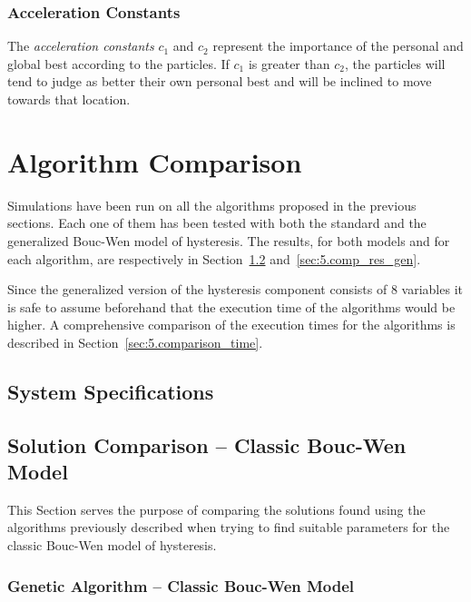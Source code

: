 \subsubsection{Acceleration Constants}
\label{sec:5.pso.constants}

The \textit{acceleration constants} $c_1$ and $c_2$ represent
the importance of the personal and global best according to the particles.
If $c_1$ is greater than $c_2$, the particles will tend to judge as better
their own personal best and will be inclined to move towards that location.


\section{Algorithm Comparison}
\label{sec:5.res}

Simulations have been run on all the algorithms proposed in the previous sections.
Each one of them has been tested with both the standard and the generalized Bouc-Wen
model of hysteresis. The results, for both models and for each algorithm,
are respectively in Section~\ref{sec:5.comp_res_classic} and~\ref{sec:5.comp_res_gen}.

Since the generalized version of the hysteresis component consists of 8 variables
it is safe to assume beforehand that the execution time of the algorithms would be higher.
A comprehensive comparison of the execution times for the algorithms is described in
Section~\ref{sec:5.comparison_time}.



\subsection{System Specifications}


\subsection{Solution Comparison -- Classic Bouc-Wen Model}
\label{sec:5.comp_res_classic}

This Section serves the purpose of comparing the solutions found using the
algorithms previously described when trying to find suitable parameters
for the classic Bouc-Wen model of hysteresis.

\subsubsection{Genetic Algorithm -- Classic Bouc-Wen Model}


